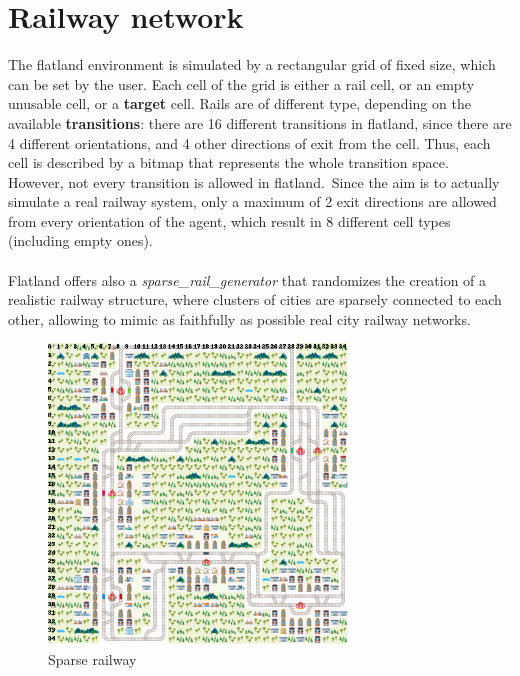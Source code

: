 \section{Railway network}
The flatland environment is simulated by a rectangular grid of fixed size, which can be set by the user. Each cell of the grid is either a rail cell, or an empty unusable cell, or a \textbf{target} cell. Rails are of different type, depending on the available \textbf{transitions}: there are 16 different transitions in flatland, since there are 4 different orientations, and 4 other directions of exit from the cell. Thus, each cell is described by a bitmap that represents the whole transition space.\\
However, not every transition is allowed in flatland.\ Since the aim is to actually simulate a real railway system, only a maximum of 2 exit directions are allowed from every orientation of the agent, which result in 8 different cell types (including empty ones).\\ \\
Flatland offers also a \textit{sparse\_rail\_generator} that randomizes the creation of a realistic railway structure, where clusters of cities are sparsely connected to each other, allowing to mimic as faithfully as possible real city railway networks.

\begin{figure}[H] 
\includegraphics[height=80mm, width=80mm, scale=0.5]{figures/sparse_railway.png}
\centering
\caption{Sparse railway}
\label{fig:s1}
\end{figure}

